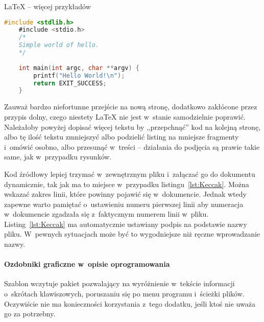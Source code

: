 \begin{easyappendix}{\LaTeX{} -- więcej przykładów}
\begin{lstlisting}[language=C,
	backgroundcolor=\color{bezowy!25!white},
	caption={Prosty kod w~języku C},
	label={lst:helloC}]
	#include <stdlib.h>
	#include <stdio.h>
	/* 
	Simple world of hello.
	*/
	
	int main(int argc, char **argv) {
		printf("Hello World!\n");
		return EXIT_SUCCESS;
	}
\end{lstlisting}

Zauważ bardzo niefortunne przejście na nową stronę, dodatkowo zakłócone przez przypis dolny, czego niestety \LaTeX{} nie jest w~stanie samodzielnie poprawić. Należałoby powyżej dopisać więcej tekstu by ,,przepchnąć'' kod na kolejną stronę, albo tę ilość tekstu zmniejszyć albo podzielić listing na mniejsze fragmenty i~omówić osobno, albo przesunąć w~treści -- działania do podjęcia są prawie takie same, jak w~przypadku rysunków.

Kod źródłowy lepiej trzymać w~zewnętrznym pliku i~załączać go do dokumentu dynamicznie, tak jak ma to miejsce w~przypadku listingu~\ref{lst:Keccak}. Można wskazać zakres linii, które powinny pojawić się w~dokumencie. Jednak wtedy zapewne warto pamiętać o~ustawieniu numeru pierwszej linii aby numeracja w~dokumencie zgadzała się z~faktycznym numerem linii w~pliku. Listing~\ref{lst:Keccak} ma automatycznie ustawiany podpis na podstawie nazwy pliku. W~pewnych sytuacjach może być to wygodniejsze niż ręczne wprowadzanie nazwy.



\paragraph{Ozdobniki graficzne w~opisie oprogramowania}
Szablon wczytuje pakiet pozwalający na wyróżnienie w~tekście informacji o~skrótach klawiszowych, poruszaniu się po menu programu i~ścieżki plików. Oczywiście nie ma konieczności korzystania z~tego dodatku, jeśli ktoś nie uważa go za potrzebny.


\end{easyappendix}
